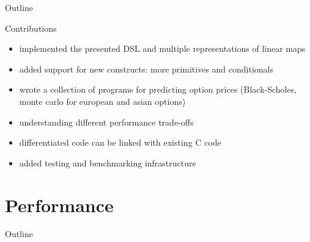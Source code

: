 \documentclass[12pt]{beamer}
\begin{document}
\begin{frame}{Outline}
\tableofcontents[currentsection]
\end{frame}

\begin{frame}{Contributions}
  \begin{itemize}
  \item implemented the presented DSL and multiple representations of
    linear maps
  \item added support for new constructs: more primitives and
    conditionals
  \item wrote a collection of programs for predicting option prices
    (Black-Scholes, monte carlo for european and asian options)
  \item understanding different performance trade-offs
  \item differentiated code can be linked with existing C code
  \item added testing and benchmarking infrastructure
  \end{itemize}
\end{frame}

\section{Performance}

\begin{frame}{Outline}
\tableofcontents[currentsection]
\end{frame}
\end{document}
